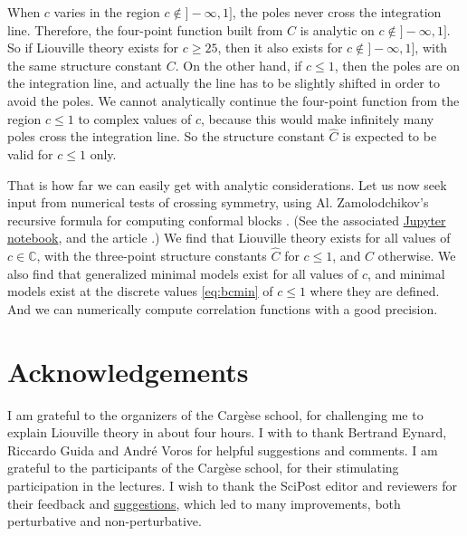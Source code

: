 \documentclass[12pt, a4paper]{article}
\theoremstyle{break}
\begin{document}
When $c$ varies in the region $c\notin ]-\infty,1]$, the poles never cross the integration line.
Therefore, 
the four-point function built from $C$ is analytic on $c\notin ]-\infty,1]$. 
So if Liouville theory exists for $c\geq 25$, then it also exists for $c\notin ]-\infty,1]$, with the same structure constant $C$. 
On the other hand, if $c\leq 1$, then the poles are on the integration line, and actually the line
has to be slightly shifted in order to avoid the poles. 
We cannot analytically continue the four-point function from the region $c\leq 1$ to complex values of $c$, because this would make infinitely many poles cross the integration line.
So the structure constant $\hat C$ is expected to be valid for $c\leq 1$ only.

That is how far we can easily get with analytic considerations. 
Let us now seek input from numerical tests of crossing symmetry, using Al. Zamolodchikov's recursive formula for computing conformal blocks \cite{zz90}. (See the associated \href{https://github.com/ribault/bootstrap-2d-Python/blob/master/Liouville_demo_2.ipynb}{Jupyter notebook}, and the article \cite{rs15}.)
We find that Liouville theory exists for all values of $c\in\mathbb{C}$, with the three-point structure constants $\hat C$ for $c\leq 1$, and $C$ otherwise.
We also find that generalized minimal models exist for all values of $c$, and minimal models exist at the discrete values \eqref{eq:bcmin} of $c\leq 1$ where they are defined. 
And we can numerically compute correlation functions with a good precision.

\section*{Acknowledgements}

I am grateful to the organizers of the Carg\`ese school, for challenging me to explain Liouville theory in about four hours.
I with to thank Bertrand Eynard, Riccardo Guida and Andr\'e Voros for helpful suggestions and comments.
I am grateful to the participants of the Carg\`ese school, for their stimulating participation in the lectures.
I wish to thank the SciPost editor and reviewers for their feedback and \href{https://scipost.org/submission/1609.09523v2/}{suggestions}, which led to many improvements, both perturbative and non-perturbative.




%
\end{document}
